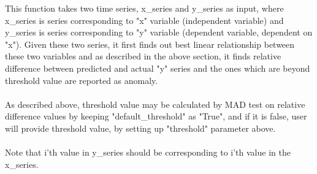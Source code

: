 This function takes two time series, x\_series and y\_series as input, where 
x\_series is series corresponding to "x" variable (independent variable) and 
y\_series is series corresponding to "y" variable (dependent variable, dependent 
on "x"). Given these two series, it first finds out best linear relationship 
between these two variables and as described in the above section, it finds 
relative difference between predicted and actual "y" series and the ones which 
are beyond threshold value are reported as anomaly. \\
\\
As described above, threshold value may be calculated by MAD test on relative 
difference values by keeping "default\_threshold" as "True", and if it is false, 
user will provide threshold value, by setting up "threshold" parameter above.\\
\\
Note that i'th value in y\_series should be corresponding to i'th value in the 
x\_series.

